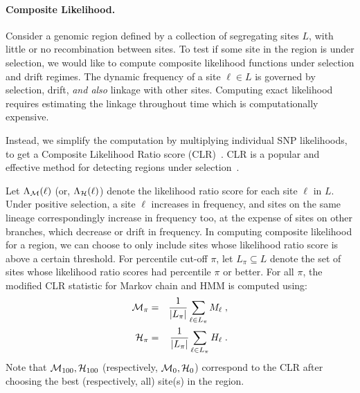 \documentclass[11pt]{article}
\begin{document}
\paragraph{Composite Likelihood.}
Consider a genomic region defined by a collection of segregating sites
$L$, with little or no recombination between sites. To test if some
site in the region is under selection, we would like to compute
composite likelihood functions under selection and drift regimes.  The
dynamic frequency of a site $\ell \in L$ is governed by selection,
drift, \emph{and also} linkage with other sites. Computing exact
likelihood requires estimating the linkage throughout time which is
computationally expensive.

Instead, we simplify the computation by multiplying individual SNP
likelihoods, to get a Composite Likelihood Ratio score
(CLR)~\cite{nielsen2005genomic,williamson2007localizing}. CLR is a
popular and effective method for detecting regions under
selection~\cite{vitti2013detecting}.

Let $\Lambda_{\cal M}(\ell)$ (or, $\Lambda_{\cal H}(\ell)$) denote the
likelihood ratio score for each site $\ell$ in $L$. Under positive
selection, a site $\ell$ increases in frequency, and sites on the same
lineage correspondingly increase in frequency too, at the expense of
sites on other branches, which decrease or drift in frequency. In
computing composite likelihood for a region, we can choose to only
include sites whose likelihood ratio score is above a certain
threshold. For percentile cut-off $\pi$, let $L_{\pi}\subseteq L$
denote the set of sites whose likelihood ratio scores had percentile
$\pi$ or better. For all $\pi$, the modified CLR statistic for Markov
chain and HMM is computed using:
\begin{eqnarray}
  {\cal M}_{\pi} &=& \frac{1}{|L_{\pi}|}\sum_{\ell \in L_{\pi}}M_\ell\;,\\
{\cal H}_{\pi} &=& \frac{1}{|L_{\pi}|}\sum_{\ell \in L_{\pi}} H_\ell\; .
  \label{eq:pihmm}
\end{eqnarray}
Note that ${\cal M}_{100},{\cal H}_{100}$ (respectively, ${\cal M}_0,{\cal 
H}_0$) correspond to the CLR after choosing the best
(respectively, all) site(s) in the region.
\end{document}
